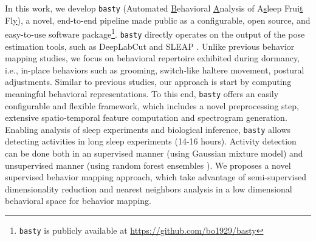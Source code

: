 In this work, we develop \texttt{basty} (Automated \underline{B}ehavioral \underline{A}nalysis of A\underline{s}leep Frui\underline{t} Fl\underline{y}), a novel, end-to-end pipeline made public as a configurable, open source, and easy-to-use software package\footnote{\texttt{basty} is publicly available at \url{https://github.com/bo1929/basty}}.
\texttt{basty} directly operates on the output of the pose estimation tools, such as DeepLabCut \citep{mathis_deeplabcut_2018} and SLEAP \cite{pereira_sleap_2022}.
Unlike previous behavior mapping studies, we focus on behavioral repertoire exhibited during dormancy, i.e., in-place behaviors such as grooming, switch-like haltere movement, postural adjustments.
Similar to previous studies, our approach is start by computing meaningful behavioral representations.
To this end, \texttt{basty} offers an easily configurable and flexible framework, which includes a novel preprocessing step, extensive spatio-temporal feature computation and spectrogram generation.
Enabling analysis of sleep experiments and biological inference, \texttt{basty} allows detecting activities in long sleep experiments (14-16 hours).
Activity detection can be done both in an supervised manner (using Gaussian mixture model) and unsupervised manner (using random forest ensembles \citep{breiman_random_2001}).
We proposes a novel supervised behavior mapping approach, which take advantage of semi-supervised dimensionality reduction and nearest neighbors analysis in a low dimensional behavioral space for behavior mapping.


